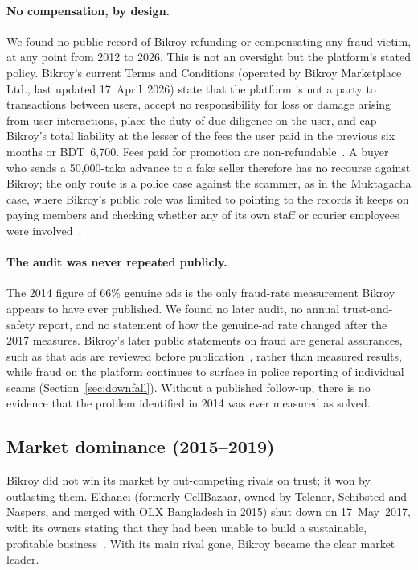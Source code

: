 \documentclass[11pt,a4paper]{article}
\begin{document}
\paragraph{No compensation, by design.} We found no public record of Bikroy refunding or
compensating any fraud victim, at any point from 2012 to 2026. This is not an oversight
but the platform's stated policy. Bikroy's current Terms and Conditions (operated by Bikroy
Marketplace Ltd., last updated 17~April~2026) state that the platform is not a party to
transactions between users, accept no responsibility for loss or damage arising from user
interactions, place the duty of due diligence on the user, and cap Bikroy's total liability
at the lesser of the fees the user paid in the previous six months or BDT~6{,}700. Fees paid
for promotion are non-refundable~\cite{bikroy_terms}. A buyer who sends a 50{,}000-taka
advance to a fake seller therefore has no recourse against Bikroy; the only route is a
police case against the scammer, as in the Muktagacha case, where Bikroy's public role was limited
to pointing to the records it keeps on paying members and checking whether any of its own
staff or courier employees were involved~\cite{ds_muktagacha}.

\paragraph{The audit was never repeated publicly.} The 2014 figure of 66\% genuine ads is
the only fraud-rate measurement Bikroy appears to have ever published. We found no later
audit, no annual trust-and-safety report, and no statement of how the genuine-ad rate
changed after the 2017 measures. Bikroy's later public statements on fraud are general
assurances, such as that ads are reviewed before publication~\cite{ds_jiji}, rather than
measured results, while fraud on the platform continues to surface in police reporting of
individual scams (Section~\ref{sec:downfall}). Without a published follow-up, there is no evidence that the
problem identified in 2014 was ever measured as solved.

\subsection{Market dominance (2015--2019)}

Bikroy did not win its market by out-competing rivals on trust; it won by outlasting them.
Ekhanei (formerly CellBazaar, owned by Telenor, Schibsted and Naspers, and merged with OLX
Bangladesh in 2015) shut down on 17~May~2017, with its owners stating that they had been
unable to build a sustainable, profitable business~\cite{fs_ekhanei}. With its main rival
gone, Bikroy became the clear market leader.
\end{document}
